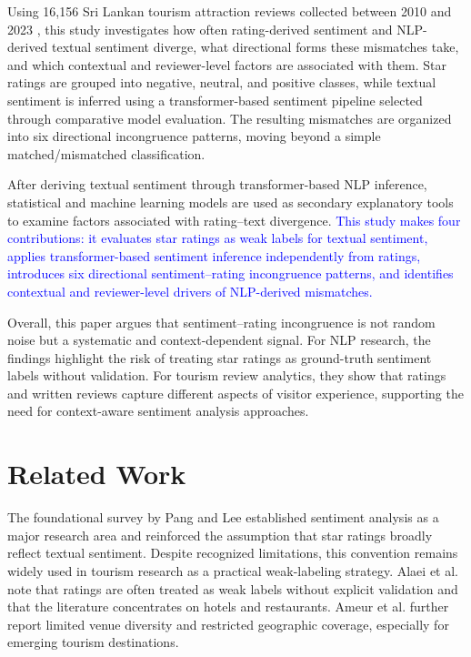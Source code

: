 \documentclass[conference]{IEEEtran}
\newcommand{\changed}[1]{\textcolor{blue}{#1}}
\begin{document}
Using 16,156 Sri Lankan tourism attraction reviews collected between 2010 and 2023 \cite{Sewwandi}, this study investigates how often rating-derived sentiment and NLP-derived textual sentiment diverge, what directional forms these mismatches take, and which contextual and reviewer-level factors are associated with them. Star ratings are grouped into negative, neutral, and positive classes, while textual sentiment is inferred using a transformer-based sentiment pipeline selected through comparative model evaluation. The resulting mismatches are organized into six directional incongruence patterns, moving beyond a simple matched/mismatched classification.

After deriving textual sentiment through transformer-based NLP inference, statistical and machine learning models are used as secondary explanatory tools to examine factors associated with rating--text divergence. \changed{This study makes four contributions: it evaluates star ratings as weak labels for textual sentiment, applies transformer-based sentiment inference independently from ratings, introduces six directional sentiment--rating incongruence patterns, and identifies contextual and reviewer-level drivers of NLP-derived mismatches.}

Overall, this paper argues that sentiment--rating incongruence is not random noise but a systematic and context-dependent signal. For NLP research, the findings highlight the risk of treating star ratings as ground-truth sentiment labels without validation. For tourism review analytics, they show that ratings and written reviews capture different aspects of visitor experience, supporting the need for context-aware sentiment analysis approaches.

\section{Related Work}
The foundational survey by Pang and Lee \cite{Pang} established sentiment analysis as a
major research area and reinforced the assumption that star ratings
broadly reflect textual sentiment. Despite recognized
limitations, this convention remains widely used in tourism research as a
practical weak-labeling strategy. Alaei et al. \cite{alaei} note that ratings are
often treated as weak labels without explicit validation and that the
literature concentrates on hotels and restaurants. Ameur et al. \cite{Ameur} further report limited venue
diversity and restricted geographic coverage, especially
for emerging tourism destinations.
\end{document}
